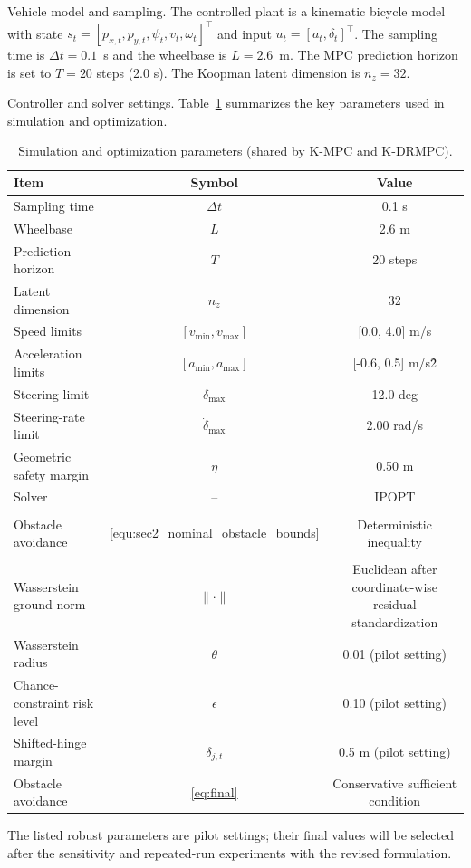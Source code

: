 \documentclass[pdflatex,sn-mathphys,Numbered]{sn-jnl}
\numberwithin{equation}{section}
\begin{document}
	Vehicle model and sampling. The controlled plant is a kinematic bicycle model with state
	$s_t=[p_{x,t},p_{y,t},\psi_t,v_t,\omega_t]^\top$ and input $u_t=[a_t,\delta_t]^\top$.
	The sampling time is $\Delta t=0.1$~s and the wheelbase is $L=2.6$~m.
	The MPC prediction horizon is set to $T=20$ steps (2.0 s).
	The Koopman latent dimension is $n_z=32$. 
	
	Controller and solver settings. Table~\ref{tab:sim_params} summarizes the key parameters used in simulation and optimization.
	
	\begin{table}[htbp]
		\centering
		\caption{Simulation and optimization parameters (shared by K-MPC and K-DRMPC).}
		\label{tab:sim_params}
		\scriptsize
		\setlength{\tabcolsep}{3pt}
		\begin{tabularx}{\columnwidth}{>{\raggedright\arraybackslash}X c c}
			\toprule
			\textbf{Item} & \textbf{Symbol} & \textbf{Value} \\
			\midrule
			Sampling time & $\Delta t$ & 0.1 s \\
			Wheelbase & $L$ & 2.6 m\\
			Prediction horizon & $T$ & 20 steps\\
			Latent dimension & $n_z$ & 32 \\
			Speed limits & $[v_{\min},v_{\max}]$ & [0.0, 4.0] m/s \\
			Acceleration limits & $[a_{\min},a_{\max}]$ & [-0.6, 0.5] m/s\^2 \\
			Steering limit & $\delta_{\max}$ & 12.0 deg \\
			Steering-rate limit & $\dot{\delta}_{\max}$ & 2.00 rad/s \\
			Geometric safety margin & $\eta$ & 0.50 m \\
			Solver & -- & IPOPT \\[2pt]
			\midrule
			\multicolumn{3}{l}{\textbf{Non-Robust (K-MPC) specific:}} \\
			Obstacle avoidance & \eqref{equ:sec2_nominal_obstacle_bounds} & Deterministic inequality \\
			\midrule
			\multicolumn{3}{l}{\textbf{Robust (K-DRMPC) specific:}} \\
			Wasserstein ground norm & $\|\cdot\|$ & Euclidean after coordinate-wise residual standardization \\
			Wasserstein radius & $\theta$ & 0.01 (pilot setting) \\
			Chance-constraint risk level & $\epsilon$ & 0.10 (pilot setting) \\
			Shifted-hinge margin & $\delta_{j,t}$ & 0.5 m (pilot setting) \\
			Obstacle avoidance & \eqref{eq:final} & Conservative sufficient condition \\
			\bottomrule
		\end{tabularx}
	\end{table}
	The listed robust parameters are pilot settings; their final values will be selected after the sensitivity and repeated-run experiments with the revised formulation.
	
\end{document}
